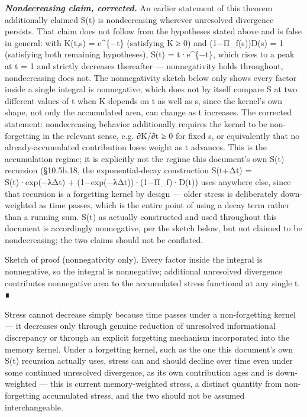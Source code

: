 \documentclass[
]{article}
\begin{document}
\emph{\textbf{Nondecreasing claim, corrected.}} An earlier statement of
this theorem additionally claimed S(t) is nondecreasing wherever
unresolved divergence persists. That claim does not follow from the
hypotheses stated above and is false in general: with K(t,s) =
e\^{}\{−t\} (satisfying K ≥ 0) and (1−Π\_f(s))D(s) = 1 (satisfying both
remaining hypotheses), S(t) = t·e\^{}\{−t\}, which rises to a peak at t
= 1 and strictly decreases thereafter --- nonnegativity holds
throughout, nondecreasing does not. The nonnegativity sketch below only
shows every factor inside a single integral is nonnegative, which does
not by itself compare S at two different values of t when K depends on t
as well as s, since the kernel's own shape, not only the accumulated
area, can change as t increases. The corrected statement: nondecreasing
behavior additionally requires the kernel to be non-forgetting in the
relevant sense, e.g. ∂K/∂t ≥ 0 for fixed s, or equivalently that no
already-accumulated contribution loses weight as t advances. This is the
accumulation regime; it is explicitly not the regime this document's own
S(t) recursion (§10.5b.18, the exponential-decay construction S(t+Δt) =
S(t)·exp(−λΔt) + (1−exp(−λΔt))·(1−Π\_f)·D(t)) uses anywhere else, since
that recursion is a forgetting kernel by design --- older stress is
deliberately down-weighted as time passes, which is the entire point of
using a decay term rather than a running sum. S(t) as actually
constructed and used throughout this document is accordingly
nonnegative, per the sketch below, but not claimed to be nondecreasing;
the two claims should not be conflated.

Sketch of proof (nonnegativity only). Every factor inside the integral
is nonnegative, so the integral is nonnegative; additional unresolved
divergence contributes nonnegative area to the accumulated stress
functional at any single t. ∎

Stress cannot decrease simply because time passes under a non-forgetting
kernel --- it decreases only through genuine reduction of unresolved
informational discrepancy or through an explicit forgetting mechanism
incorporated into the memory kernel. Under a forgetting kernel, such as
the one this document's own S(t) recursion actually uses, stress can and
should decline over time even under some continued unresolved
divergence, as its own contribution ages and is down-weighted --- this
is current memory-weighted stress, a distinct quantity from
non-forgetting accumulated stress, and the two should not be assumed
interchangeable.
\end{document}

